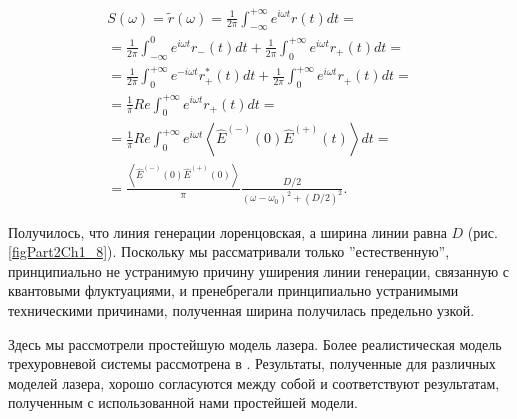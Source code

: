 \begin{eqnarray}
S\left(\omega\right) = \tilde{r}\left(\omega\right) = 
\frac{1}{2\pi}
\int_{-\infty}^{+\infty}e^{i \omega t} r\left(t\right) dt =
\nonumber \\
=
\frac{1}{2\pi}
\int_{-\infty}^0e^{i \omega t} r_{-}\left(t\right) dt +
\frac{1}{2\pi}
\int_0^{+\infty}e^{i \omega t} r_{+}\left(t\right) dt = 
\nonumber \\
=
\frac{1}{2\pi}
\int_0^{+\infty}e^{- i \omega t} r_{+}^{*}\left(t\right) dt +
\frac{1}{2\pi}
\int_0^{+\infty}e^{i \omega t} r_{+}\left(t\right) dt = 
\nonumber \\
=
\frac{1}{\pi} Re
\int_0^{+\infty}e^{i \omega t} r_{+}\left(t\right) dt = 
\nonumber \\
= \frac{1}{\pi}Re
\int_0^{+\infty}e^{i \omega t}
\left<\hat{E}^{(-)}\left(0\right)\hat{E}^{(+)}\left(t\right)\right> dt
=
\nonumber \\
=
\frac{\left<\hat{E}^{(-)}\left(0\right)\hat{E}^{(+)}\left(0\right)\right>}{\pi}
\frac{D/2}{\left(\omega - \omega_0\right)^2 + \left(D/2\right)^2}. 
\label{eqCh3_22}
\end{eqnarray}




Получилось, что линия генерации лоренцовская, а ширина линии равна $D$ 
(рис.\ref{figPart2Ch1_8}). Поскольку мы рассматривали только ''естественную'',
принципиально не устранимую причину уширения линии генерации,
связанную с квантовыми флуктуациями, и пренебрегали принципиально
устранимыми техническими причинами, полученная ширина получилась
предельно узкой.  

Здесь мы рассмотрели простейшую модель лазера. Более
реалистическая модель трехуровневой системы рассмотрена в
\cite{bHaken1988}. Результаты, полученные для различных моделей
лазера, хорошо согласуются между собой и соответствуют результатам, 
полученным с использованной нами простейшей модели. 

